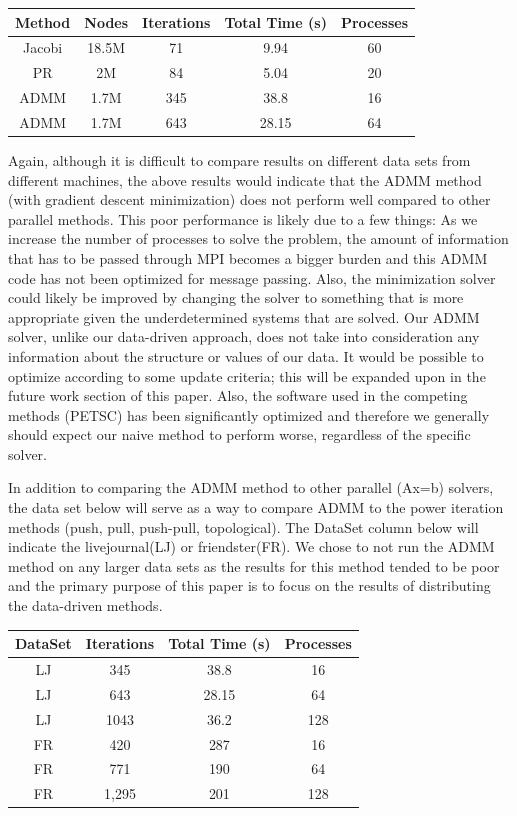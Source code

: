 \documentclass[letterpaper,11pt,onecolumn]{article}
\begin{document}
\begin{center}
  \begin{tabular}{c|c|c|c|c}
	\hline
	Method & Nodes & Iterations & Total Time (s) & Processes \\
	\hline\hline
	Jacobi & 18.5M & 71 & 9.94 & 60\\
	PR & 2M & 84  & 5.04 & 20 \\ 
	ADMM & 1.7M & 345 & 38.8  & 16 \\
	ADMM & 1.7M & 643 & 28.15 & 64 \\
  \end{tabular}
\end{center}

Again, although it is difficult to compare results on different data sets from different machines, the above results would indicate that the ADMM method (with gradient descent minimization) does not perform well compared to other parallel methods. This poor performance is likely due to a few things: As we increase the number of processes to solve the problem, the amount of information that has to be passed through MPI becomes a bigger burden and this ADMM code has not been optimized for message passing. Also, the minimization solver could likely be improved by changing the solver to something that is more appropriate given the underdetermined systems that are solved. Our ADMM solver, unlike our data-driven approach, does not take into consideration any information about the structure or values of our data. It would be possible to optimize according to some update criteria; this will be expanded upon in the future work section of this paper. Also, the software used in the competing methods (PETSC) has been significantly optimized and therefore we generally should expect our naive method to perform worse, regardless of the specific solver.

In addition to comparing the ADMM method to other parallel (Ax=b) solvers, the data set below will serve as a way to compare ADMM to the power iteration methods (push, pull, push-pull, topological). The DataSet column below will indicate the livejournal(LJ) or friendster(FR). We chose to not run the ADMM method on any larger data sets as the results for this method tended to be poor and the primary purpose of this paper is to focus on the results of distributing the data-driven methods.


\begin{center}
  \begin{tabular}{c|c|c|c}
	\hline
	DataSet & Iterations & Total Time (s) & Processes \\
	\hline\hline
	LJ & 345 & 38.8  & 16 \\
	LJ & 643 & 28.15 & 64 \\
	LJ & 1043 & 36.2 & 128 \\
	FR & 420 & 287 & 16 \\
	FR & 771 & 190 & 64 \\
	FR & 1,295 & 201 & 128 \\
  \end{tabular}
\end{center}
\end{document}
